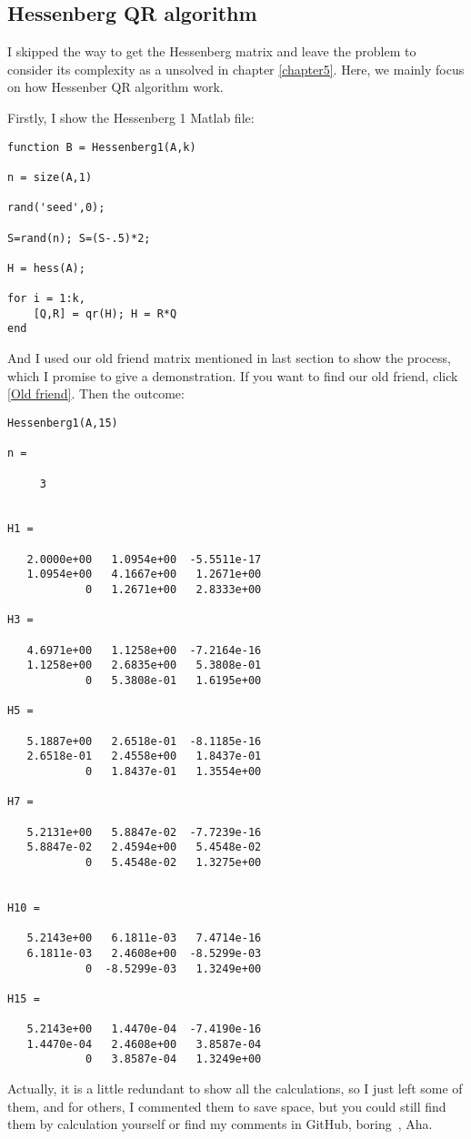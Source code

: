 \subsection{Hessenberg QR algorithm}
I skipped the way to get the Hessenberg matrix and leave the problem to consider its complexity as a unsolved in chapter \ref{chapter5}.
Here, we mainly focus on how Hessenber QR algorithm work.

Firstly, I show the Hessenberg 1 Matlab file:
\begin{verbatim}
function B = Hessenberg1(A,k)

n = size(A,1)

rand('seed',0);

S=rand(n); S=(S-.5)*2;

H = hess(A);

for i = 1:k,
    [Q,R] = qr(H); H = R*Q
end
\end{verbatim}
And I used our old friend matrix mentioned in last section to show the process, which I promise to give a demonstration. \label{Hessenberg QR algorithm} If you want to find our old friend,  click \ref{Old friend}. Then the outcome:
\begin{verbatim}
Hessenberg1(A,15)

n =

     3


H1 =

   2.0000e+00   1.0954e+00  -5.5511e-17
   1.0954e+00   4.1667e+00   1.2671e+00
            0   1.2671e+00   2.8333e+00

H3 =

   4.6971e+00   1.1258e+00  -7.2164e-16
   1.1258e+00   2.6835e+00   5.3808e-01
            0   5.3808e-01   1.6195e+00

H5 =

   5.1887e+00   2.6518e-01  -8.1185e-16
   2.6518e-01   2.4558e+00   1.8437e-01
            0   1.8437e-01   1.3554e+00

H7 =

   5.2131e+00   5.8847e-02  -7.7239e-16
   5.8847e-02   2.4594e+00   5.4548e-02
            0   5.4548e-02   1.3275e+00


H10 =

   5.2143e+00   6.1811e-03   7.4714e-16
   6.1811e-03   2.4608e+00  -8.5299e-03
            0  -8.5299e-03   1.3249e+00

H15 =

   5.2143e+00   1.4470e-04  -7.4190e-16
   1.4470e-04   2.4608e+00   3.8587e-04
            0   3.8587e-04   1.3249e+00
\end{verbatim}
Actually, it is a little redundant to show all the calculations, so I just left some of them, and for others, I commented them to save space, but you could still find them by calculation yourself or find my comments in GitHub, boring~, Aha. 

